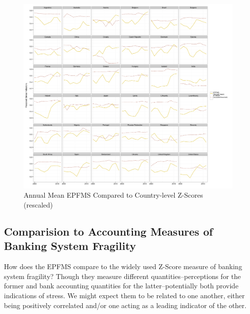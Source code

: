 \documentclass[]{article}
\begin{document}
\clearpage

\begin{landscape}
\begin{figure}

    \caption{Annual Mean EPFMS Compared to Country-level Z-Scores (rescaled)}
    \label{z_score}

    \begin{center}
        \includegraphics[scale=0.4]{analysis/figures/compare_to_z-score.pdf}
    \end{center}

\end{figure}
\end{landscape}

\subsection{Comparision to Accounting Measures of Banking System Fragility}

How does the EPFMS compare to the widely used Z-Score measure of banking system fragility? Though they measure different quantities--perceptions for the former and bank accounting quantities for the latter--potentially both provide indications of stress. We might expect them to be related to one another, either being positively correlated and/or one acting as a leading indicator of the other.
\end{document}
